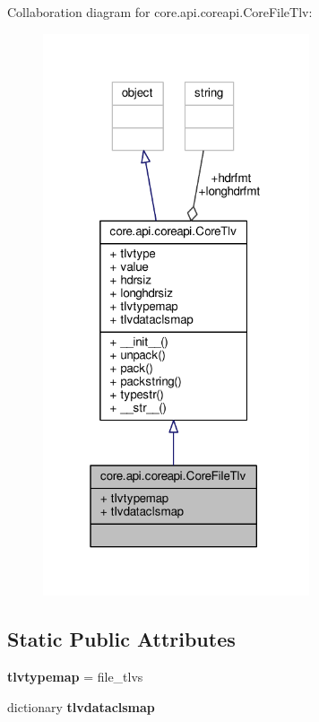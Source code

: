 Collaboration diagram for core.\+api.\+coreapi.\+Core\+File\+Tlv\+:
\nopagebreak
\begin{figure}[H]
\begin{center}
\leavevmode
\includegraphics[width=223pt]{classcore_1_1api_1_1coreapi_1_1_core_file_tlv__coll__graph}
\end{center}
\end{figure}
\subsection*{Static Public Attributes}
\begin{DoxyCompactItemize}
\item 
\hypertarget{classcore_1_1api_1_1coreapi_1_1_core_file_tlv_a1cba3e6ed5a43e4b48f61059f2228227}{{\bfseries tlvtypemap} = file\+\_\+tlvs}\label{classcore_1_1api_1_1coreapi_1_1_core_file_tlv_a1cba3e6ed5a43e4b48f61059f2228227}

\item 
dictionary {\bfseries tlvdataclsmap}
\end{DoxyCompactItemize}
